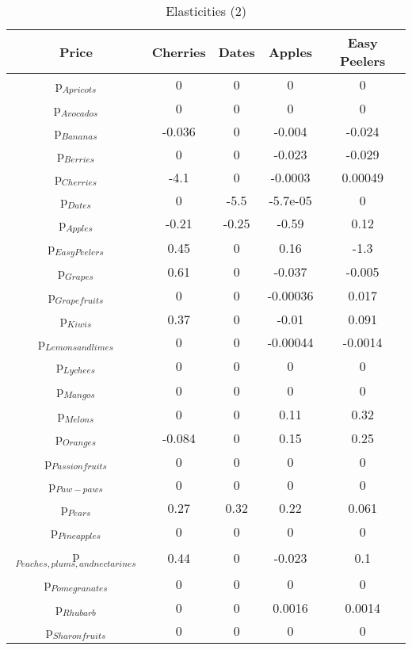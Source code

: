 \documentclass[11pt]{article}
\begin{document}
\begin{table}[h]
\caption{Elasticities (2)}
\label{Table: elasticities 2}
\begin{center}
\begin{tabular}{ccccc}
Price & Cherries & Dates & Apples & Easy Peelers \\ \hline
p$_{Apricots}$ & 0 & 0 & 0 & 0 \\ 
p$_{Avocados}$ & 0 & 0 & 0 & 0 \\ 
p$_{Bananas}$ & -0.036 & 0 & -0.004 & -0.024 \\ 
p$_{Berries}$ & 0 & 0 & -0.023 & -0.029 \\ 
p$_{Cherries}$ & -4.1 & 0 & -0.0003 & 0.00049 \\ 
p$_{Dates}$ & 0 & -5.5 & -5.7e-05 & 0 \\ 
p$_{Apples}$ & -0.21 & -0.25 & -0.59 & 0.12 \\ 
p$_{Easy Peelers}$ & 0.45 & 0 & 0.16 & -1.3 \\ 
p$_{Grapes}$ & 0.61 & 0 & -0.037 & -0.005 \\ 
p$_{Grapefruits}$ & 0 & 0 & -0.00036 & 0.017 \\ 
p$_{Kiwis}$ & 0.37 & 0 & -0.01 & 0.091 \\ 
p$_{Lemons and limes}$ & 0 & 0 & -0.00044 & -0.0014 \\ 
p$_{Lychees}$ & 0 & 0 & 0 & 0 \\ 
p$_{Mangos}$ & 0 & 0 & 0 & 0 \\ 
p$_{Melons}$ & 0 & 0 & 0.11 & 0.32 \\ 
p$_{Oranges}$ & -0.084 & 0 & 0.15 & 0.25 \\ 
p$_{Passion fruits}$ & 0 & 0 & 0 & 0 \\ 
p$_{Paw-paws}$ & 0 & 0 & 0 & 0 \\ 
p$_{Pears}$ & 0.27 & 0.32 & 0.22 & 0.061 \\ 
p$_{Pineapples}$ & 0 & 0 & 0 & 0 \\ 
p$_{Peaches, plums, and nectarines}$ & 0.44 & 0 & -0.023 & 0.1 \\ 
p$_{Pomegranates}$ & 0 & 0 & 0 & 0 \\ 
p$_{Rhubarb}$ & 0 & 0 & 0.0016 & 0.0014 \\ 
p$_{Sharon fruits}$ & 0 & 0 & 0 & 0 \\ 
\end{tabular}
\end{center}
\end{table}
\end{document}
